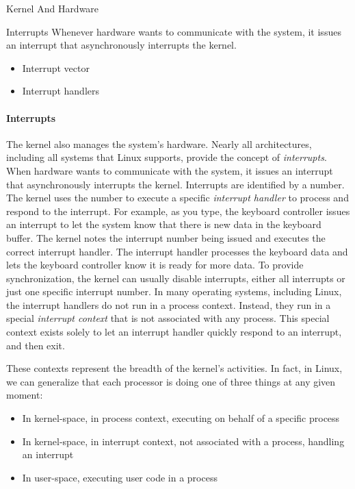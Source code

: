 \begin{frame}{Kernel And Hardware}
  \begin{block}{Interrupts}
    Whenever hardware wants to communicate with the system, it issues an interrupt that
    asynchronously interrupts the kernel.
    \begin{itemize}
    \item Interrupt vector
    \item Interrupt handlers
    \end{itemize}
  \end{block}
\end{frame}

\paragraph{Interrupts}

The kernel also manages the system's hardware. Nearly all architectures, including all
systems that Linux supports, provide the concept of \emph{interrupts}. When hardware wants
to communicate with the system, it issues an interrupt that asynchronously interrupts the
kernel. Interrupts are identified by a number. The kernel uses the number to execute a
specific \emph{interrupt handler} to process and respond to the interrupt. For example, as
you type, the keyboard controller issues an interrupt to let the system know that there is
new data in the keyboard buffer. The kernel notes the interrupt number being issued and
executes the correct interrupt handler. The interrupt handler processes the keyboard data
and lets the keyboard controller know it is ready for more data. To provide
synchronization, the kernel can usually disable interrupts, either all interrupts or just
one specific interrupt number. In many operating systems, including Linux, the interrupt
handlers do not run in a process context. Instead, they run in a special \emph{interrupt
  context} that is not associated with any process. This special context exists solely to
let an interrupt handler quickly respond to an interrupt, and then exit. 

These contexts represent the breadth of the kernel's activities. In fact, in Linux, we
can generalize that each processor is doing one of three things at any given moment:

\begin{itemize}
\item In kernel-space, in process context, executing on behalf of a specific process
\item In kernel-space, in interrupt context, not associated with a process, handling an
  interrupt
\item In user-space, executing user code in a process
\end{itemize}

